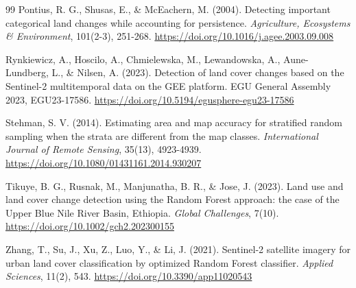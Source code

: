 \documentclass[11pt,a4paper]{article}
\begin{document}
\begin{thebibliography}{99}
Pontius, R. G., Shusas, E., \& McEachern, M. (2004). Detecting important categorical land changes while accounting for persistence. \textit{Agriculture, Ecosystems \& Environment}, 101(2-3), 251-268. \url{https://doi.org/10.1016/j.agee.2003.09.008}

Rynkiewicz, A., Hoscilo, A., Chmielewska, M., Lewandowska, A., Aune-Lundberg, L., \& Nilsen, A. (2023). Detection of land cover changes based on the Sentinel-2 multitemporal data on the GEE platform. EGU General Assembly 2023, EGU23-17586. \url{https://doi.org/10.5194/egusphere-egu23-17586}

Stehman, S. V. (2014). Estimating area and map accuracy for stratified random sampling when the strata are different from the map classes. \textit{International Journal of Remote Sensing}, 35(13), 4923-4939. \url{https://doi.org/10.1080/01431161.2014.930207}

Tikuye, B. G., Rusnak, M., Manjunatha, B. R., \& Jose, J. (2023). Land use and land cover change detection using the Random Forest approach: the case of the Upper Blue Nile River Basin, Ethiopia. \textit{Global Challenges}, 7(10). \url{https://doi.org/10.1002/gch2.202300155}

Zhang, T., Su, J., Xu, Z., Luo, Y., \& Li, J. (2021). Sentinel-2 satellite imagery for urban land cover classification by optimized Random Forest classifier. \textit{Applied Sciences}, 11(2), 543. \url{https://doi.org/10.3390/app11020543}

\end{thebibliography}
\end{document}
